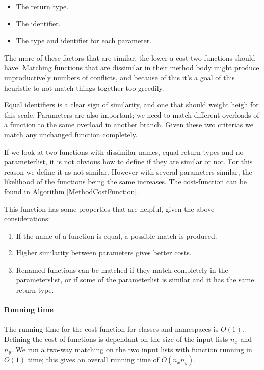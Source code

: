 \documentclass[11pt]{article}
\begin{document}
\begin{itemize}
    \item The return type.
    \item The identifier.
    \item The type and identifier for each parameter.
\end{itemize}

The more of these factors that are similar, the lower a cost two functions should have. Matching functions that are dissimilar in their method body might produce unproductively numbers of conflicts, and because of this it's a goal of this heuristic to not match things together too greedily.

Equal identifiers is a clear sign of similarity, and one that should weight heigh for this scale. Parameters are also important; we need to match different overloads of a function to the same overload in another branch. Given these two criterias we match any unchanged function completely.

If we look at two functions with dissimilar names, equal return types and no parameterlist, it is not obvious how to define if they are similar or not. For this reason we define it as not similar. However with several parameters similar, the likelihood of the functions being the same increases.  The cost-function can be found in Algorithm \ref{MethodCostFunction}.

This function has some properties that are helpful, given the above considerations:

\begin{enumerate}
\item If the name of a function is equal, a possible match is produced.
\item Higher similarity between parameters gives better costs.
\item Renamed functions can be matched if they match completely in the parameterslist, or if some of the parameterlist is similar and it has the same return type.
\end{enumerate}

\paragraph{Running time} The running time for the cost function for classes and namespaces is $O(1)$. Defining the cost of functions is dependant on the size of the input lists $n_x$ and $n_y$. We run a two-way matching on the two input lists with function running in $O(1)$ time; this gives an overall running time of $O(n_x n_y)$.
\end{document}
